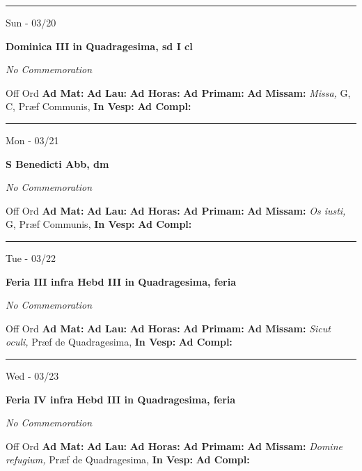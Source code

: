 \documentclass[letterpaper, 10pt]{article}
\begin{document}
\hrule
\begin{center}
Sun - 03/20
\end{center}\textbf{ \large Dominica III in Quadragesima, \textnormal{\normalsize sd I cl}}

\textit{No Commemoration}\begin{justify}
Off Ord
\textbf{Ad Mat: }
\textbf{Ad Lau: }
\textbf{Ad Horas: }
\textbf{Ad Primam: }
\textbf{Ad Missam:} \textit{Missa, } G, C, Præf Communis, 
\textbf{In Vesp: }
\textbf{Ad Compl: }\end{justify}



\hrule
\begin{center}
Mon - 03/21
\end{center}\textbf{ \large S Benedicti Abb, \textnormal{\normalsize dm}}

\textit{No Commemoration}\begin{justify}
Off Ord
\textbf{Ad Mat: }
\textbf{Ad Lau: }
\textbf{Ad Horas: }
\textbf{Ad Primam: }
\textbf{Ad Missam:} \textit{Os iusti, } G, Præf Communis, 
\textbf{In Vesp: }
\textbf{Ad Compl: }\end{justify}



\hrule
\begin{center}
Tue - 03/22
\end{center}\textbf{ \large Feria III infra Hebd III in Quadragesima, \textnormal{\normalsize feria}}

\textit{No Commemoration}\begin{justify}
Off Ord
\textbf{Ad Mat: }
\textbf{Ad Lau: }
\textbf{Ad Horas: }
\textbf{Ad Primam: }
\textbf{Ad Missam:} \textit{Sicut oculi, } Præf de Quadragesima, 
\textbf{In Vesp: }
\textbf{Ad Compl: }\end{justify}



\hrule
\begin{center}
Wed - 03/23
\end{center}\textbf{ \large Feria IV infra Hebd III in Quadragesima, \textnormal{\normalsize feria}}

\textit{No Commemoration}\begin{justify}
Off Ord
\textbf{Ad Mat: }
\textbf{Ad Lau: }
\textbf{Ad Horas: }
\textbf{Ad Primam: }
\textbf{Ad Missam:} \textit{Domine refugium, } Præf de Quadragesima, 
\textbf{In Vesp: }
\textbf{Ad Compl: }\end{justify}
\end{document}
